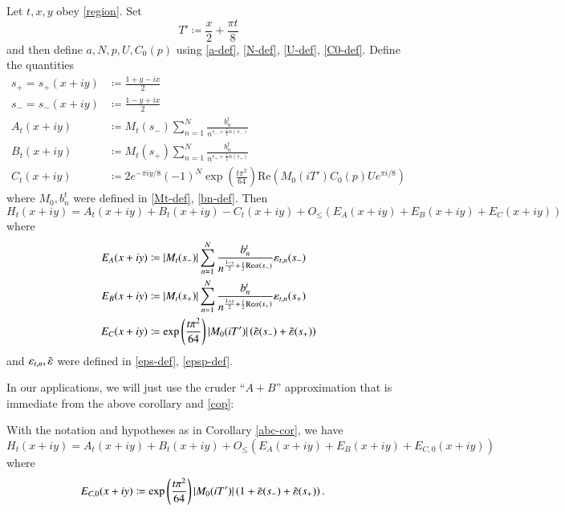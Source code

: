 \begin{corollary}[$A+B-C$ approximation]\label{abc-cor}  Let $t,x,y$ obey \eqref{region}.  Set
\begin{equation}\label{tp-def}
 T' \coloneqq \frac{x}{2} + \frac{\pi t}{8} 
\end{equation}
and then define $a,N,p,U,C_0(p)$ using \eqref{a-def}, \eqref{N-def}, \eqref{U-def}, \eqref{C0-def}.  Define the quantities
\begin{align*}
s_+ = s_+(x+iy) &\coloneqq \frac{1+y-ix}{2} \\
s_- = s_-(x+iy) &\coloneqq \frac{1-y+ix}{2} \\
A_t(x+iy) &\coloneqq M_t(s_-) \sum_{n=1}^N \frac{b_n^t}{n^{s_- +\frac{t}{2} \alpha(s_-)}}  \\
B_t(x+iy) &\coloneqq M_t(s_+) \sum_{n=1}^N \frac{b_n^t}{n^{s_+ +\frac{t}{2} \alpha(s_+)}}  \\
C_t(x+iy) &\coloneqq  2 e^{-\pi i y/8} (-1)^{N} \exp\left( \frac{t \pi^2}{64}\right) \mathrm{Re}( M_0(iT') C_0(p) U e^{\pi i/8} )
\end{align*}
where $M_0, b_n^t$ were defined in \eqref{Mt-def}, \eqref{bn-def}.
Then
$$ H_t(x+iy) = A_t(x+iy) + B_t(x+iy) - C_t(x+iy) + O_{\leq}(E_A(x+iy) + E_B(x+iy) + E_C(x+iy))$$
where
\begin{align*}
E_A(x+iy) &\coloneqq \left|M_t(s_-)\right| \sum_{n=1}^N \frac{b_n^t}{n^{\frac{1-y}{2}+\frac{t}{2} \mathrm{Re} \alpha(s_-)}} \varepsilon_{t,n}(s_-) \\
E_B(x+iy) &\coloneqq \left|M_t(s_+)\right|\sum_{n=1}^N  \frac{b_n^t}{n^{\frac{1+y}{2}+\frac{t}{2} \mathrm{Re} \alpha(s_+)}} \varepsilon_{t,n}(s_+)  \\
E_C(x+iy) &\coloneqq \exp\left( \frac{t \pi^2}{64}\right) |M_0(iT')| \left(\tilde {\varepsilon}(s_-) + \tilde {\varepsilon}(s_+)\right)  
\end{align*}
and $\varepsilon_{t,n}, \tilde {\varepsilon}$ were defined in \eqref{eps-def}, \eqref{epsp-def}. 
\end{corollary}

In our applications, we will just use the cruder ``$A+B$'' approximation that is immediate from the above corollary and \eqref{cop}:

\begin{corollary}[$A+B$ approximation]\label{ab-cor} With the notation and hypotheses as in Corollary \ref{abc-cor}, we have
$$ H_t(x+iy) = A_t(x+iy) + B_t(x+iy) + O_{\leq}(E_A(x+iy) + E_B(x+iy) + E_{C,0}(x+iy))$$
where
\begin{align*}
E_{C,0}(x+iy) &\coloneqq \exp\left( \frac{t \pi^2}{64}\right) |M_0(iT')| \left(1 + \tilde {\varepsilon}(s_-) + \tilde {\varepsilon}(s_+)\right). 
\end{align*}
\end{corollary}

